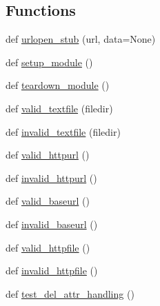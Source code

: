 \subsection*{Functions}
\begin{DoxyCompactItemize}
\item 
def \hyperlink{namespacenumpy_1_1lib_1_1tests_1_1test____datasource_a493f6be353c7320db7293b66a4893eab}{urlopen\+\_\+stub} (url, data=None)
\item 
def \hyperlink{namespacenumpy_1_1lib_1_1tests_1_1test____datasource_a99dbc970fc224b14f27fddb1d21cb098}{setup\+\_\+module} ()
\item 
def \hyperlink{namespacenumpy_1_1lib_1_1tests_1_1test____datasource_a95e028fc898e9759fb0f3647344243ea}{teardown\+\_\+module} ()
\item 
def \hyperlink{namespacenumpy_1_1lib_1_1tests_1_1test____datasource_aca352b1c08965cc890f352ab1ffccce1}{valid\+\_\+textfile} (filedir)
\item 
def \hyperlink{namespacenumpy_1_1lib_1_1tests_1_1test____datasource_a2a9907bbb2fa4e6896e3686fc668de91}{invalid\+\_\+textfile} (filedir)
\item 
def \hyperlink{namespacenumpy_1_1lib_1_1tests_1_1test____datasource_a4746b1d507bd301c98681b9ea01f8a1f}{valid\+\_\+httpurl} ()
\item 
def \hyperlink{namespacenumpy_1_1lib_1_1tests_1_1test____datasource_a75703813e668c21d487103837d4d2412}{invalid\+\_\+httpurl} ()
\item 
def \hyperlink{namespacenumpy_1_1lib_1_1tests_1_1test____datasource_a697b74871f7c9a7f254afc2660874fcf}{valid\+\_\+baseurl} ()
\item 
def \hyperlink{namespacenumpy_1_1lib_1_1tests_1_1test____datasource_ab145ea4eeb57a2c52c4de5070b1c82d2}{invalid\+\_\+baseurl} ()
\item 
def \hyperlink{namespacenumpy_1_1lib_1_1tests_1_1test____datasource_ad3221d01d5711ae82c467a8554b8bf82}{valid\+\_\+httpfile} ()
\item 
def \hyperlink{namespacenumpy_1_1lib_1_1tests_1_1test____datasource_a891bc0e4b3f5ff8b527a27237304e3fd}{invalid\+\_\+httpfile} ()
\item 
def \hyperlink{namespacenumpy_1_1lib_1_1tests_1_1test____datasource_a1a647529b3b75f851c91c6b9f1d191e7}{test\+\_\+del\+\_\+attr\+\_\+handling} ()
\end{DoxyCompactItemize}
